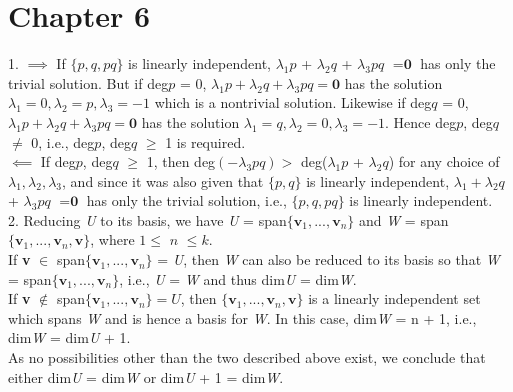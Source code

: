 \documentclass{article}
\begin{document}
    \section*{Chapter 6}
    \setlength{\parindent}{0pt}
    1. $\implies$ If $\{p, q, pq\}$ is linearly independent, $\lambda_1p$ + $\lambda_2q$ + $\lambda_3pq$ $= \textbf{0}$ has only the trivial solution. But if deg$p$ = 0, $\lambda_1p + \lambda_2q + \lambda_3pq =\textbf{0}$ has the solution $\lambda_1 = 0, \lambda_2 = p, \lambda_3 = -1$ which is a nontrivial solution. Likewise if deg$q$ = 0, $\lambda_1p + \lambda_2q + \lambda_3pq = \textbf{0}$ has the solution $\lambda_1 = q, \lambda_2 = 0, \lambda_3 = -1$. Hence deg$p$, deg$q$ $\neq$ 0, i.e., deg$p$, deg$q$ $\geq$ 1 is required.\\
  $\impliedby$ If deg$p$, deg$q$ $\geq$ 1, then deg$(-\lambda_3pq) >$ deg($\lambda_1$$p$ + $\lambda_2$$q$) for any choice of $\lambda_1, \lambda_2, \lambda_3$, and since it was also given that $\{p, q\}$ is linearly independent, $\lambda_1 +\lambda_2q$ + $\lambda_3pq$ $= \textbf{0}$ has only the trivial solution, i.e., $\{p, q, pq\}$ is linearly independent.\\

    2. Reducing \textit{U} to its basis, we have \textit{U} = span$\{\textbf{v}_1, ..., \textbf{v}_n\}$ and \textit{W} = span$\{\textbf{v}_1, ..., \textbf{v}_n, \textbf{v}\}$, where $1 \leq$ $n$ $\leq k$.\\
    If \textbf{v} $\in$ span$\{\textbf{v}_1, ..., \textbf{v}_n\}$ = \textit{U}, then \textit{W} can also be reduced to its basis so that \textit{W} = span$\{\textbf{v}_1, ..., \textbf{v}_n\}$, i.e., \textit{U} = \textit{W} and thus dim\textit{U} = dim\textit{W}.\\
    If \textbf{v} $\notin$ span$\{\textbf{v}_1, ..., \textbf{v}_n\} = \textit{U}$, then $\{\textbf{v}_1, ..., \textbf{v}_n, \textbf{v}\}$ is a linearly independent set which spans \textit{W} and is hence a basis for \textit{W}. In this case, dim\textit{W} = n + 1, i.e., dim\textit{W} = dim\textit{U} + 1. \\
    As no possibilities other than the two described above exist, we conclude that either dim\textit{U} = dim\textit{W} or dim\textit{U} + 1 = dim\textit{W}.\\
\end{document}
